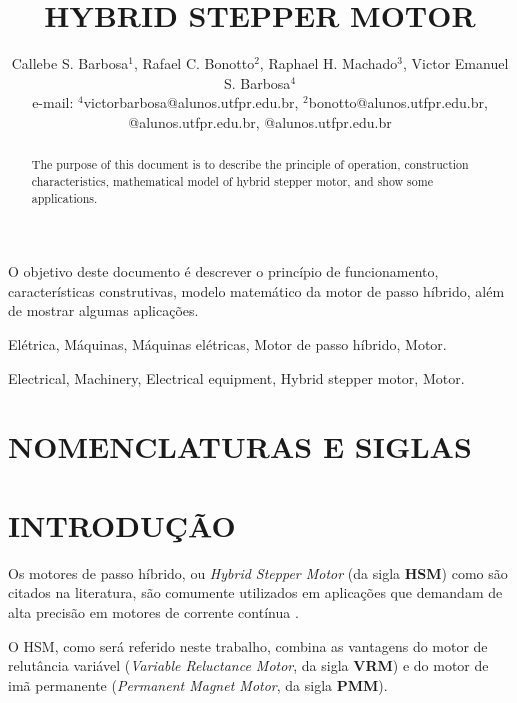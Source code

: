 \documentclass[portugues]{sobraep}
\title{HYBRID STEPPER MOTOR}
\author{Callebe S. Barbosa$^{1}$, Rafael C. Bonotto$^{2}$, Raphael H. Machado$^{3}$, Victor Emanuel S. Barbosa$^{4}$\\
	\normalsize e-mail: $^{4}$victorbarbosa@alunos.utfpr.edu.br, $^{2}$bonotto@alunos.utfpr.edu.br, @alunos.utfpr.edu.br, @alunos.utfpr.edu.br
}
\begin{document}
\maketitle

\begin{resumo}
	O objetivo deste documento é descrever o princípio de funcionamento, características construtivas, modelo matemático da motor de passo híbrido, além de mostrar algumas aplicações.
\end{resumo}

\begin{palavraschave }
	Elétrica, Máquinas, Máquinas elétricas, Motor de passo híbrido, Motor.
\end{palavraschave }

\englishtitle

\begin{abstract}
	The purpose of this document is to describe the principle of operation, construction characteristics, mathematical model of hybrid stepper motor, and show some applications.
\end{abstract}

\begin{keywords}
	Electrical, Machinery, Electrical equipment, Hybrid stepper motor, Motor.
\end{keywords}

\section*{NOMENCLATURAS E SIGLAS}



\section{INTRODUÇÃO}
	
	Os motores de passo híbrido, ou \textit{Hybrid Stepper Motor} (da sigla \textbf{HSM}) como são citados na literatura, são comumente utilizados em aplicações que demandam de alta precisão em motores de corrente contínua \cite{ieeeRusso}.
	
	O HSM, como será referido neste trabalho, combina as vantagens do motor de relutância variável (\textit{Variable Reluctance Motor}, da sigla \textbf{VRM}) e do motor de imã permanente (\textit{Permanent Magnet Motor}, da sigla \textbf{PMM}). 
	
\end{document}
